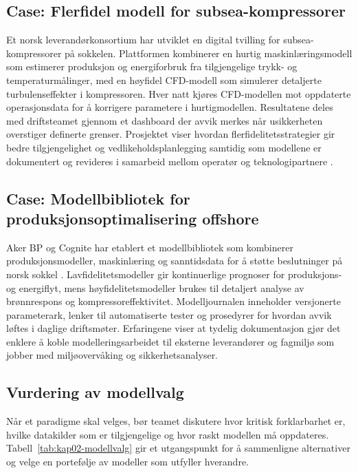 \subsection{Case: Flerfidel modell for subsea-kompressorer}
Et norsk leverandørkonsortium har utviklet en digital tvilling for subsea-kompressorer på sokkelen. Plattformen kombinerer en
hurtig maskinlæringsmodell som estimerer produksjon og energiforbruk fra tilgjengelige trykk- og temperaturmålinger, med en
høyfidel CFD-modell som simulerer detaljerte turbulenseffekter i kompressoren. Hver natt kjøres CFD-modellen mot oppdaterte
operasjonsdata for å korrigere parametere i hurtigmodellen. Resultatene deles med driftsteamet gjennom et dashboard der
avvik merkes når usikkerheten overstiger definerte grenser. Prosjektet viser hvordan flerfidelitetsstrategier gir bedre
tilgjengelighet og vedlikeholdsplanlegging samtidig som modellene er dokumentert og revideres i samarbeid mellom operatør og
teknologipartnere \citep{sintef2021digital}.

\subsection{Case: Modellbibliotek for produksjonsoptimalisering offshore}
Aker BP og Cognite har etablert et modellbibliotek som kombinerer produksjonsmodeller, maskinlæring og sanntidsdata for å støtte
beslutninger på norsk sokkel \citep{cognite2023akerbp}. Lavfidelitetsmodeller gir kontinuerlige prognoser for produksjons- og
energiflyt, mens høyfidelitetsmodeller brukes til detaljert analyse av brønnrespons og kompressoreffektivitet. Modelljournalen
inneholder versjonerte parameterark, lenker til automatiserte tester og prosedyrer for hvordan avvik løftes i daglige
driftsmøter. Erfaringene viser at tydelig dokumentasjon gjør det enklere å koble modelleringsarbeidet til eksterne leverandører
og fagmiljø som jobber med miljøovervåking og sikkerhetsanalyser.

\subsection{Vurdering av modellvalg}
Når et paradigme skal velges, bør teamet diskutere hvor kritisk forklarbarhet er, hvilke datakilder som er tilgjengelige og hvor
raskt modellen må oppdateres. Tabell~\ref{tab:kap02-modellvalg} gir et utgangspunkt for å sammenligne alternativer og velge en
portefølje av modeller som utfyller hverandre.

